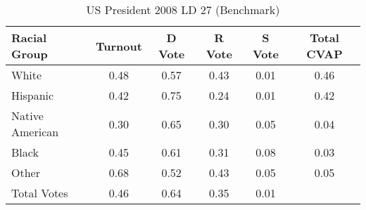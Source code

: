 \begin{table}[htb]
\begin{center}
\caption{US President 2008 LD 27 (Benchmark)}
\label{pres08_cvap_ld_27_benchmark}
\begin{tabular}{lccccc}
  \hline
Racial Group & Turnout & D Vote & R Vote & S Vote & Total CVAP \\ 
  \hline
White & 0.48 & 0.57 & 0.43 & 0.01 & 0.46 \\ 
  Hispanic & 0.42 & 0.75 & 0.24 & 0.01 & 0.42 \\ 
  Native American & 0.30 & 0.65 & 0.30 & 0.05 & 0.04 \\ 
  Black & 0.45 & 0.61 & 0.31 & 0.08 & 0.03 \\ 
  Other & 0.68 & 0.52 & 0.43 & 0.05 & 0.05 \\ 
  Total Votes & 0.46 & 0.64 & 0.35 & 0.01 &  \\ 
   \hline
\end{tabular}
\end{center}
\end{table}
